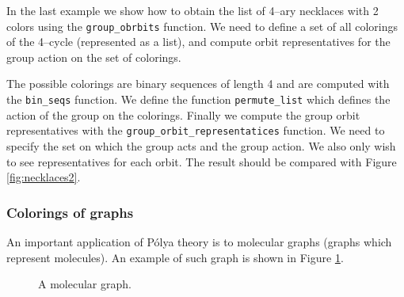 \documentclass[11pt]{article}
\newcommand{\command}[1]{\texttt{#1}}
\begin{document}
In the last example we show how to obtain the list of 4--ary necklaces
with 2 colors using the \command{group\_obrbits} function. We need to
define a set of all colorings of the 4--cycle (represented as a list),
and compute orbit representatives for the group action on the set of
colorings.

The possible colorings are binary sequences of length 4 and are
computed with the \command{bin\_seqs} function. We define the function
\command{permute\_list} which defines the action of the group on the
colorings. Finally we compute the group orbit representatives with the
\command{group\_orbit\_representatices} function. We need to specify
the set on which the group acts and the group action. We also only
wish to see representatives for each orbit. The result should be
compared with Figure \ref{fig:necklaces2}.


\subsubsection{Colorings of graphs}

An important application of P\'olya theory is to molecular graphs
(graphs which represent molecules). An example of such graph
is shown in Figure \ref{fig:mgraph}.

\begin{figure}
\begin{center}
\end{center}
\caption{A molecular graph.}
\label{fig:mgraph}
\end{figure}
\end{document}
